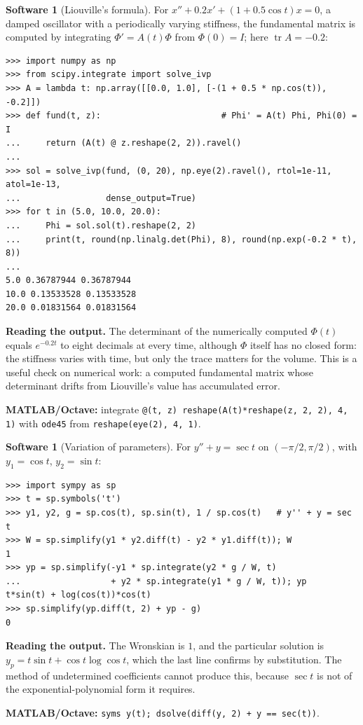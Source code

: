 \documentclass[11pt,a4paper]{article}
\numberwithin{equation}{section}
\DeclareMathOperator{\tr}{tr}
\theoremstyle{definition}
\newtheorem{software}[thm]{Software}
\begin{document}
\begin{software}[Liouville's formula]
\label{sw:liouville}
For $x'' + 0.2x' + (1 + 0.5\cos t)x = 0$, a damped oscillator with a periodically varying stiffness, the fundamental matrix is computed by integrating $\Phi' = A(t)\Phi$ from $\Phi(0) = I$;
here $\tr A = -0.2$:
{\small\begin{verbatim}
>>> import numpy as np
>>> from scipy.integrate import solve_ivp
>>> A = lambda t: np.array([[0.0, 1.0], [-(1 + 0.5 * np.cos(t)), -0.2]])
>>> def fund(t, z):                        # Phi' = A(t) Phi, Phi(0) = I
...     return (A(t) @ z.reshape(2, 2)).ravel()
...
>>> sol = solve_ivp(fund, (0, 20), np.eye(2).ravel(), rtol=1e-11, atol=1e-13,
...                 dense_output=True)
>>> for t in (5.0, 10.0, 20.0):
...     Phi = sol.sol(t).reshape(2, 2)
...     print(t, round(np.linalg.det(Phi), 8), round(np.exp(-0.2 * t), 8))
...
5.0 0.36787944 0.36787944
10.0 0.13533528 0.13533528
20.0 0.01831564 0.01831564
\end{verbatim}}
\textbf{Reading the output.} The determinant of the numerically computed $\Phi(t)$ equals $e^{-0.2t}$ to eight decimals at every time, although $\Phi$ itself has no closed form: the
stiffness varies with time, but only the trace matters for the volume. This is a useful check on numerical work: a computed fundamental matrix whose determinant
drifts from Liouville's value has accumulated error.

\textbf{MATLAB/Octave:} integrate \texttt{@(t, z) reshape(A(t)*reshape(z, 2, 2), 4, 1)} with \texttt{ode45} from \texttt{reshape(eye(2), 4, 1)}.
\end{software}

\begin{software}[Variation of parameters]
\label{sw:varpar}
For $y'' + y = \sec t$ on $(-\pi/2, \pi/2)$, with $y_1 = \cos t$, $y_2 = \sin t$:
{\small\begin{verbatim}
>>> import sympy as sp
>>> t = sp.symbols('t')
>>> y1, y2, g = sp.cos(t), sp.sin(t), 1 / sp.cos(t)   # y'' + y = sec t
>>> W = sp.simplify(y1 * y2.diff(t) - y2 * y1.diff(t)); W
1
>>> yp = sp.simplify(-y1 * sp.integrate(y2 * g / W, t)
...                  + y2 * sp.integrate(y1 * g / W, t)); yp
t*sin(t) + log(cos(t))*cos(t)
>>> sp.simplify(yp.diff(t, 2) + yp - g)
0
\end{verbatim}}
\textbf{Reading the output.} The Wronskian is $1$, and the particular solution is $y_p = t\sin t + \cos t\log\cos t$, which the last line confirms by substitution. The method of
undetermined coefficients cannot produce this, because $\sec t$ is not of the exponential-polynomial form it requires.

\textbf{MATLAB/Octave:} \texttt{syms y(t); dsolve(diff(y, 2) + y == sec(t))}.
\end{software}
\end{document}
